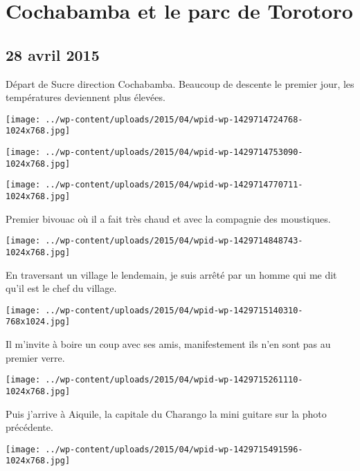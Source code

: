 \chapter{Cochabamba et le parc de Torotoro}
\section*{28 avril 2015}
Départ de Sucre direction Cochabamba. Beaucoup de descente le premier jour, les températures deviennent plus élevées. \newline
 \newline
\centerline{\texttt{[image: ../wp-content/uploads/2015/04/wpid-wp-1429714724768-1024x768.jpg]} } 
 \newline
 \newline
\centerline{\texttt{[image: ../wp-content/uploads/2015/04/wpid-wp-1429714753090-1024x768.jpg]} } 
 \newline
 \newline
\centerline{\texttt{[image: ../wp-content/uploads/2015/04/wpid-wp-1429714770711-1024x768.jpg]} } 
 \newline
 Premier bivouac où il a fait très chaud et avec la compagnie des moustiques. \newline
 \newline
\centerline{\texttt{[image: ../wp-content/uploads/2015/04/wpid-wp-1429714848743-1024x768.jpg]} } 
 \newline
 En traversant un village le lendemain, je suis arrêté par un homme qui me dit qu'il est le chef du village. \newline
 \newline
\centerline{\texttt{[image: ../wp-content/uploads/2015/04/wpid-wp-1429715140310-768x1024.jpg]} } 
 \newline
 Il m'invite à boire un coup avec ses amis, manifestement ils n'en sont pas au premier verre. \newline
 \newline
\centerline{\texttt{[image: ../wp-content/uploads/2015/04/wpid-wp-1429715261110-1024x768.jpg]} } 
 \newline
 Puis j'arrive à Aiquile, la capitale du Charango la mini guitare sur la photo précédente. \newline
 \newline
\centerline{\texttt{[image: ../wp-content/uploads/2015/04/wpid-wp-1429715491596-1024x768.jpg]} } 
 \newline

